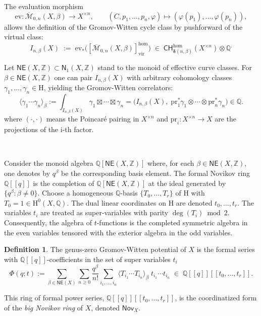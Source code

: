 \documentclass[12pt,a4paper]{amsart}
\theoremstyle{definition}
\newtheorem{definition}[theorem]{Definition}
\theoremstyle{remark}
\newcommand{\Q}{\mathbb{Q}}
\begin{document}
The evaluation morphism
\[
\mathrm{ev}:\overline{\mathcal M}_{0,n}(X,\beta)\longrightarrow X^{\times n},\qquad
(C,p_1,\dots,p_n,\varphi)\longmapsto (\varphi(p_1),\dots,\varphi(p_n)),
\]
allows the definition of the Gromov-Witten cycle class by pushforward of the virtual class:
\[
I_{n,\beta}(X)\;:=\;\mathrm{ev}_*\big([\overline{\mathcal M}_{0,n}(X,\beta)]_{\mathrm{vir}}^{\mathrm{hom}} \big)
\;\in\; \mathsf{CH}^{\mathrm{hom}}_{\boldsymbol{\delta}(n,\beta)}(X^{\times n})\otimes \mathbb Q^.
\]


Let $\mathsf{NE}(X,\mathbb Z)\subset\mathsf{N}_1(X,\mathbb Z)$ stand to the monoid of effective curve classes. For $\beta\in \mathsf{NE}(X,\mathbb Z)$ one can pair $I_{n,\beta}(X)$ with arbitrary cohomology classes $\gamma_1,\dots,\gamma_n\in\mathrm{H}$, yielding the Gromov-Witten correlators:
\[
\langle \gamma_1\cdots\gamma_n\rangle_\beta
:=\int_{I_{n,\beta}(X)} \gamma_1\boxtimes\cdots\boxtimes\gamma_n
=\big(I_{n,\beta}(X),\; \mathrm{pr}_1^{\ast}\gamma_1\otimes\cdots\otimes\mathrm{pr}_n^{\ast}\gamma_n\big)
\in\mathbb Q.
\]
where $(\cdot,\cdot)$ means the Poincar\'e pairing in $X^{\times n}$ and $\mathrm{pr}_i:X^{\times n}\rightarrow X$ are the projections of the i-th factor.

\ 

Consider the monoid algebra $\Q[\mathsf{NE}(X,\mathbb Z)]$ where, for each $\beta\in\mathsf{NE}(X,\mathbb Z)$, one denotes by $q^\beta$ be the corresponding basis element. The formal Novikov ring $\Q[[q]]$ is the completion of $\Q[\mathsf{NE}(X,\mathbb Z)]$ at the ideal generated by $\{q^\beta:\beta\neq 0\}$. Choose a homogeneous $\Q$-basis $\{T_0,\dots,T_{r}\}$ of $\mathrm{H}$ with $T_0=1\in\mathrm{H}^0(X,\Q)$. The dual linear coordinates on $\mathrm{H}$ are denoted $t_0,\dots,t_r$. The variables $t_i$ are treated as super-variables with parity $\deg(T_i)\bmod 2$. Consequently, the algebra of $t$-functions is the completed symmetric algebra in the even variables tensored with the exterior algebra in the odd variables. 

\begin{definition}
The genus-zero Gromov-Witten potential of $X$ is the formal series with $\mathbb Q[[q]]$-coefficients in the set of super variables $t_i$
\[
\Phi(q;t)
:=\sum_{\beta\in\mathsf{NE}(X)}\sum_{n\ge 0}\frac{q^\beta}{n!}\sum_{i_1,\dots,i_n}
\langle T_{i_1}\cdots T_{i_n}\rangle_\beta \; t_{i_1}\cdots t_{i_n}
\;\in\; \mathbb Q[[q]][[t_0,\dots,t_r]].
\]
\end{definition}
This ring of formal power series, $\Q[[q]][[t_0,\dots,t_r]]$, is the coordinatized form of the \emph{big Novikov ring} of $X$, denoted $\mathsf{Nov}_X$.
\end{document}
